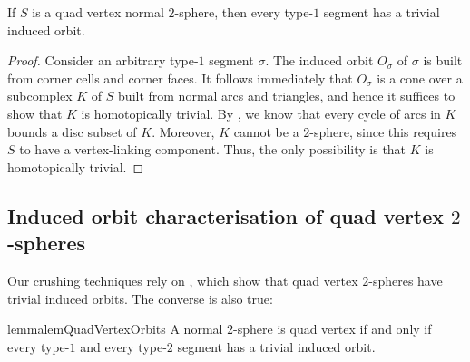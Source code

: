 \documentclass[a4paper,UKenglish,cleveref, autoref, thm-restate]{lipics-v2021}
\begin{document}
\begin{corollary}\label{cor:cornerRegion}
If $S$ is a quad vertex normal $2$-sphere, then every type-$1$ segment has a trivial induced orbit.
\end{corollary}

\begin{proof}
Consider an arbitrary type-$1$ segment $\sigma$.
The induced orbit $O_\sigma$ of $\sigma$ is built from corner cells and corner faces.
It follows immediately that $O_\sigma$ is a cone over a subcomplex $K$ of $S$ built from
normal arcs and triangles, and hence it suffices to show that $K$ is homotopically trivial.
By , we know that every cycle of arcs in $K$ bounds a disc subset of $K$.
Moreover, $K$ cannot be a $2$-sphere, since this requires $S$ to have a vertex-linking component.
Thus, the only possibility is that $K$ is homotopically trivial.
\end{proof}

\subsection{Induced orbit characterisation of quad vertex \texorpdfstring{$2$}{2}-spheres}\label{ssec:characteriseQuadVertexSphere}

Our crushing techniques rely on , which show that quad vertex $2$-spheres have trivial induced orbits.
The converse is also true:

\begin{restatable}{lemma}{lemQuadVertexOrbits}\label{lem:quadVertexOrbits}
A normal $2$-sphere is quad vertex if and only if every type-$1$ and every type-$2$ segment has a trivial induced orbit.
\end{restatable}
\end{document}
